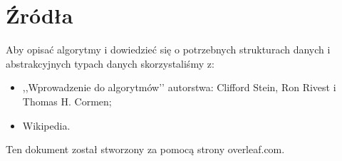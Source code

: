\documentclass{article}
\begin{document}
\section{Źródła}
{\fontsize{12}{12}\selectfont
Aby opisać algorytmy i dowiedzieć się o potrzebnych strukturach danych i abstrakcyjnych typach danych skorzystaliśmy z:
\begin{itemize}
    \item ,,Wprowadzenie do algorytmów’’ autorstwa: Clifford Stein, Ron Rivest i Thomas H. Cormen;
    \item Wikipedia.
\end{itemize}

Ten dokument został stworzony za pomocą strony overleaf.com.

}
\end{document}
